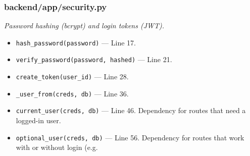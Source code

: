\subsubsection*{backend/app/security.py}
\textit{Password hashing (bcrypt) and login tokens (JWT).}
\begin{itemize}[nosep,leftmargin=1.5em]
\item \texttt{hash\_\allowbreak{}password(\allowbreak{}password)} --- Line 17.
\item \texttt{verify\_\allowbreak{}password(\allowbreak{}password,\allowbreak{} hashed)} --- Line 21.
\item \texttt{create\_\allowbreak{}token(\allowbreak{}user\_\allowbreak{}id)} --- Line 28.
\item \texttt{\_\allowbreak{}user\_\allowbreak{}from(\allowbreak{}creds,\allowbreak{} db)} --- Line 36.
\item \texttt{current\_\allowbreak{}user(\allowbreak{}creds,\allowbreak{} db)} --- Line 46. Dependency for routes that need a logged-in user.
\item \texttt{optional\_\allowbreak{}user(\allowbreak{}creds,\allowbreak{} db)} --- Line 56. Dependency for routes that work with or without login (e.g.
\end{itemize}
